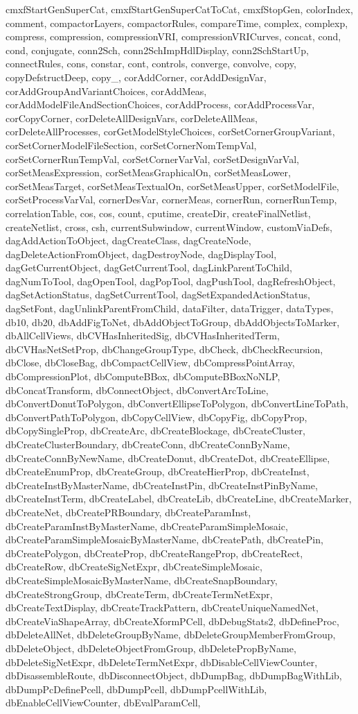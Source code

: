 {{cmxfStartGenSuperCat, cmxfStartGenSuperCatToCat, cmxfStopGen, colorIndex, comment, compactorLayers, compactorRules, compareTime, complex, complexp, compress, compression, compressionVRI, compressionVRICurves, concat, cond, cond, conjugate, conn2Sch, conn2SchImpHdlDisplay, conn2SchStartUp, connectRules, cons, constar, cont, controls, converge, convolve, copy, copyDefstructDeep, copy_, corAddCorner, corAddDesignVar, corAddGroupAndVariantChoices, corAddMeas, corAddModelFileAndSectionChoices, corAddProcess, corAddProcessVar, corCopyCorner, corDeleteAllDesignVars, corDeleteAllMeas, corDeleteAllProcesses, corGetModelStyleChoices, corSetCornerGroupVariant, corSetCornerModelFileSection, corSetCornerNomTempVal, corSetCornerRunTempVal, corSetCornerVarVal, corSetDesignVarVal, corSetMeasExpression, corSetMeasGraphicalOn, corSetMeasLower, corSetMeasTarget, corSetMeasTextualOn, corSetMeasUpper, corSetModelFile, corSetProcessVarVal, cornerDesVar, cornerMeas, cornerRun, cornerRunTemp, correlationTable, cos, cos, count, cputime, createDir, createFinalNetlist, createNetlist, cross, csh, currentSubwindow, currentWindow, customViaDefs, dagAddActionToObject, dagCreateClass, dagCreateNode, dagDeleteActionFromObject, dagDestroyNode, dagDisplayTool, dagGetCurrentObject, dagGetCurrentTool, dagLinkParentToChild, dagNumToTool, dagOpenTool, dagPopTool, dagPushTool, dagRefreshObject, dagSetActionStatus, dagSetCurrentTool, dagSetExpandedActionStatus, dagSetFont, dagUnlinkParentFromChild, dataFilter, dataTrigger, dataTypes, db10, db20, dbAddFigToNet, dbAddObjectToGroup, dbAddObjectsToMarker, dbAllCellViews, dbCVHasInheritedSig, dbCVHasInheritedTerm, dbCVHasNetSetProp, dbChangeGroupType, dbCheck, dbCheckRecursion, dbClose, dbCloseBag, dbCompactCellView, dbCompressPointArray, dbCompressionPlot, dbComputeBBox, dbComputeBBoxNoNLP, dbConcatTransform, dbConnectObject, dbConvertArcToLine, dbConvertDonutToPolygon, dbConvertEllipseToPolygon, dbConvertLineToPath, dbConvertPathToPolygon, dbCopyCellView, dbCopyFig, dbCopyProp, dbCopySingleProp, dbCreateArc, dbCreateBlockage, dbCreateCluster, dbCreateClusterBoundary, dbCreateConn, dbCreateConnByName, dbCreateConnByNewName, dbCreateDonut, dbCreateDot, dbCreateEllipse, dbCreateEnumProp, dbCreateGroup, dbCreateHierProp, dbCreateInst, dbCreateInstByMasterName, dbCreateInstPin, dbCreateInstPinByName, dbCreateInstTerm, dbCreateLabel, dbCreateLib, dbCreateLine, dbCreateMarker, dbCreateNet, dbCreatePRBoundary, dbCreateParamInst, dbCreateParamInstByMasterName, dbCreateParamSimpleMosaic, dbCreateParamSimpleMosaicByMasterName, dbCreatePath, dbCreatePin, dbCreatePolygon, dbCreateProp, dbCreateRangeProp, dbCreateRect, dbCreateRow, dbCreateSigNetExpr, dbCreateSimpleMosaic, dbCreateSimpleMosaicByMasterName, dbCreateSnapBoundary, dbCreateStrongGroup, dbCreateTerm, dbCreateTermNetExpr, dbCreateTextDisplay, dbCreateTrackPattern, dbCreateUniqueNamedNet, dbCreateViaShapeArray, dbCreateXformPCell, dbDebugStats2, dbDefineProc, dbDeleteAllNet, dbDeleteGroupByName, dbDeleteGroupMemberFromGroup, dbDeleteObject, dbDeleteObjectFromGroup, dbDeletePropByName, dbDeleteSigNetExpr, dbDeleteTermNetExpr, dbDisableCellViewCounter, dbDisassembleRoute, dbDisconnectObject, dbDumpBag, dbDumpBagWithLib, dbDumpPcDefinePcell, dbDumpPcell, dbDumpPcellWithLib, dbEnableCellViewCounter, dbEvalParamCell, }}
